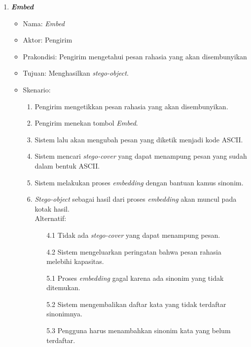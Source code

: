 \begin{enumerate}
	\item \textbf{\textit{Embed}}
	\begin{itemize}
		\item Nama: \textit{Embed}
		\item Aktor: Pengirim
		\item Prakondisi: Pengirim mengetahui pesan rahasia yang akan disembunyikan
		\item Tujuan: Menghasilkan \textit{stego-object}.
		\item Skenario:
		\renewcommand{\labelenumii}{\arabic{enumii}.}
			\begin{enumerate}
				\item Pengirim mengetikkan pesan rahasia yang akan disembunyikan.
				\item Pengirim menekan tombol \textit{Embed}.
				\item Sistem lalu akan mengubah pesan yang diketik menjadi kode ASCII.
				\item Sistem mencari \textit{stego-cover} yang dapat menampung pesan yang sudah dalam bentuk ASCII.
				\item Sistem melakukan proses \textit{embedding} dengan bantuan kamus sinonim.
				\item \textit{Stego-object} sebagai hasil dari proses \textit{embedding} akan muncul pada kotak hasil.\\
				Alternatif:
				\begin{itemize}
					\item [4.1] Tidak ada \textit{stego-cover} yang dapat menampung pesan.
					\item [4.2] Sistem mengeluarkan peringatan bahwa pesan rahasia melebihi kapasitas.
					\item [5.1] Proses \textit{embedding} gagal karena ada sinonim yang tidak ditemukan.
					\item [5.2] Sistem mengembalikan daftar kata yang tidak terdaftar sinonimnya.
					\item [5.3] Pengguna harus menambahkan sinonim kata yang belum terdaftar.
				\end{itemize}
			\end{enumerate}
	\end{itemize}
	

\end{enumerate}

